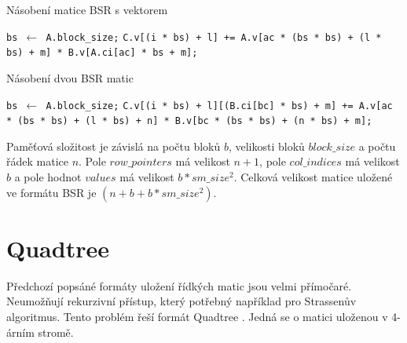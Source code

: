 \label{alg:bsr-mvm}
\begin{algorithm}[H]
	\caption{Násobení matice BSR s vektorem}\label{bsr-mvm}
	\begin{algorithmic}[1]
		\State \texttt{bs $\gets$ A.block\_size;}
						\State \texttt{C.v[(i * bs) + l] += A.v[ac * (bs * bs) + (l * bs) + m] * B.v[A.ci[ac] * bs + m];}
					\EndFor
				\EndFor
			\EndFor
		\EndFor
		\EndProcedure
	\end{algorithmic}
\end{algorithm}

\label{alg:bsr-mmm}
\begin{algorithm}[H]
	\caption{Násobení dvou BSR matic}\label{bsr-mmm}
	\begin{algorithmic}[1]
		\State \texttt{bs $\gets$ A.block\_size;}
								\State \texttt{C.v[(i * bs) + l][(B.ci[bc] * bs) + m] += A.v[ac * (bs * bs) + (l * bs) + n] * B.v[bc * (bs * bs) + (n * bs) + m];}
							\EndFor
						\EndFor
					\EndFor
				\EndFor
			\EndFor
		\EndFor
		\EndProcedure
	\end{algorithmic}
\end{algorithm}

Paměťová složitost je závislá na počtu bloků $b$, velikosti bloků $block\_size$ a počtu řádek matice $n$. Pole $row\_pointers$ má velikost $n+1$, pole $col\_indices$ má velikost $b$ a pole hodnot $values$ má velikost $b * sm\_size^2$. Celková velikost matice uložené ve formátu BSR je \bigO$(n + b + b * sm\_size^2)$. 

\section{Quadtree}

Předchozí popsáné formáty uložení řídkých matic jsou velmi přímočaré. Neumožňují rekurzivní přístup, který potřebný například pro Strassenův algoritmus. Tento problém řeší formát Quadtree \cite{JA_SNA_08_QUAD}\cite{qdtsf}. Jedná se o matici uloženou v 4-árním stromě.

